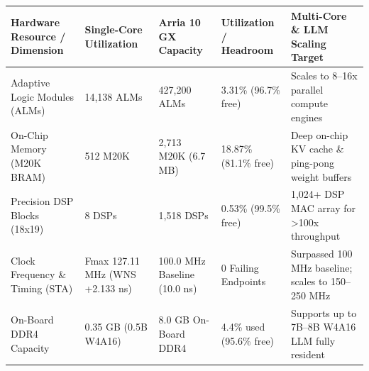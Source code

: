 \documentclass[11pt,a4paper]{article}
\begin{document}
{\footnotesize\renewcommand{\arraystretch}{1.14}\begin{longtable}{@{}L{0.21\textwidth}L{0.16\textwidth}L{0.16\textwidth}L{0.15\textwidth}L{0.22\textwidth}@{}}\toprule

\textbf{Hardware Resource /\allowbreak{} Dimension} & \textbf{Single-Core Utilization} & \textbf{Arria 10 GX Capacity} & \textbf{Utilization /\allowbreak{} Headroom} & \textbf{Multi-Core \& LLM Scaling Target}\\\midrule\endhead

Adaptive Logic Modules (\allowbreak{}ALMs)\allowbreak{} & 14,\allowbreak{}138 ALMs & 427,\allowbreak{}200 ALMs & 3.31\% (\allowbreak{}96.7\% free)\allowbreak{} & Scales to 8--16x parallel compute engines\\[2pt]

On-Chip Memory (\allowbreak{}M20K BRAM)\allowbreak{} & 512 M20K & 2,\allowbreak{}713 M20K (\allowbreak{}6.7 MB)\allowbreak{} & 18.87\% (\allowbreak{}81.1\% free)\allowbreak{} & Deep on-chip KV cache \& ping-pong weight buffers\\[2pt]

Precision DSP Blocks (\allowbreak{}18x19)\allowbreak{} & 8 DSPs & 1,\allowbreak{}518 DSPs & 0.53\% (\allowbreak{}99.5\% free)\allowbreak{} & 1,\allowbreak{}024+\allowbreak{} DSP MAC array for >100x throughput\\[2pt]

Clock Frequency \& Timing (\allowbreak{}STA)\allowbreak{} & Fmax 127.11 MHz (\allowbreak{}WNS +\allowbreak{}2.133 ns)\allowbreak{} & 100.0 MHz Baseline (\allowbreak{}10.0 ns)\allowbreak{} & 0 Failing Endpoints & Surpassed 100 MHz baseline; scales to 150--250 MHz\\[2pt]

On-Board DDR4 Capacity & 0.35 GB (\allowbreak{}0.5B W4A16)\allowbreak{} & 8.0 GB On-Board DDR4 & 4.4\% used (\allowbreak{}95.6\% free)\allowbreak{} & Supports up to 7B--8B W4A16 LLM fully resident\\[2pt]

\bottomrule\end{longtable}}
\end{document}
